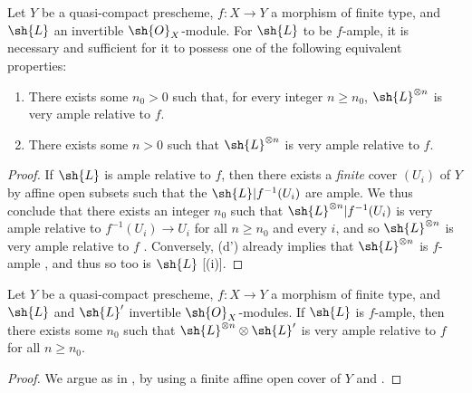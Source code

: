 \begin{proposition}[4.6.11]
\label{II.4.6.11}
Let $Y$ be a quasi-compact prescheme, $f:X\to Y$ a morphism of finite type, and $\sh{L}$ an invertible $\sh{O}_X$-module.
For $\sh{L}$ to be $f$-ample, it is necessary and sufficient for it to possess one of the following equivalent properties:
\begin{enumerate}
  \item[\rm{(d)}] There exists some $n_0>0$ such that, for every integer $n\geq n_0$, $\sh{L}^{\otimes n}$ is very ample relative to $f$.
  \item[\rm{(d')}] There exists some $n>0$ such that $\sh{L}^{\otimes n}$ is very ample relative to $f$.
\end{enumerate}
\end{proposition}

\begin{proof}
If $\sh{L}$ is ample relative to $f$, then there exists a \emph{finite} cover $(U_i)$ of $Y$ by affine open subsets such that the $\sh{L}|f^{-1}(U_i)$ are ample.
We thus conclude  that there exists an integer $n_0$ such that $\sh{L}^{\otimes n}|f^{-1}(U_i)$ is very ample relative to $f^{-1}(U_i)\to U_i$ for all $n\geq n_0$ and every $i$, and so $\sh{L}^{\otimes n}$ is very ample relative to $f$ .
Conversely, (d') already implies that $\sh{L}^{\otimes n}$ is $f$-ample , and thus so too is $\sh{L}$ [(i)].
\end{proof}

\begin{corollary}[4.6.12]
\label{II.4.6.12}
Let $Y$ be a quasi-compact prescheme, $f:X\to Y$ a morphism of finite type, and $\sh{L}$ and $\sh{L}'$ invertible $\sh{O}_X$-modules.
If $\sh{L}$ is $f$-ample, then there exists some $n_0$ such that $\sh{L}^{\otimes n}\otimes\sh{L}'$ is very ample relative to $f$ for all $n\geq n_0$.
\end{corollary}

\begin{proof}
We argue as in , by using a finite affine open cover of $Y$ and .
\end{proof}

